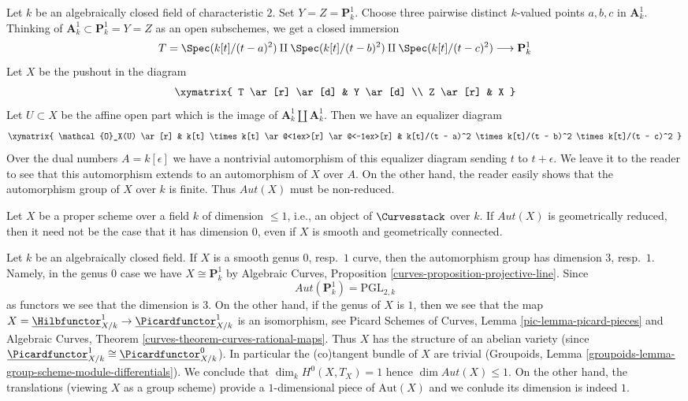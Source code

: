 \begin{example}
\label{example-non-reduced}
Let $k$ be an algebraically closed field of characteristic $2$.
Set $Y = Z = \mathbf{P}^1_k$. Choose three pairwise distinct $k$-valued points
$a, b, c$ in $\mathbf{A}^1_k$. Thinking of
$\mathbf{A}^1_k \subset \mathbf{P}^1_k = Y = Z$ as an open subschemes,
we get a closed immersion
$$
T =  \Spec(k[t]/(t - a)^2) \amalg \Spec(k[t]/(t - b)^2)
\amalg \Spec(k[t]/(t - c)^2)
\longrightarrow
\mathbf{P}^1_k
$$
Let $X$ be the pushout in the diagram
$$
\xymatrix{
T \ar[r] \ar[d] & Y \ar[d] \\
Z \ar[r] & X
}
$$
Let $U \subset X$ be the affine open part which is the image of
$\mathbf{A}^1_k \amalg \mathbf{A}^1_k$. Then we have an equalizer
diagram
$$
\xymatrix{
\mathcal{O}_X(U) \ar[r] &
k[t] \times k[t] \ar@<1ex>[r] \ar@<-1ex>[r] &
k[t]/(t - a)^2 \times k[t]/(t - b)^2 \times k[t]/(t - c)^2
}
$$
Over the dual numbers $A = k[\epsilon]$ we have a nontrivial automorphism
of this equalizer diagram sending $t$ to $t + \epsilon$. We leave it to the
reader to see that this automorphism extends to an automorphism of $X$
over $A$. On the other hand, the reader easily shows that the
automorphism group of $X$ over $k$ is finite.
Thus $\mathit{Aut}(X)$ must be non-reduced.
\end{example}

\noindent
Let $X$ be a proper scheme over a field $k$ of dimension $\leq 1$, i.e.,
an object of $\Curvesstack$ over $k$. If $\mathit{Aut}(X)$
is geometrically reduced, then it need not be the case that
it has dimension $0$, even if $X$ is smooth and geometrically connected.

\begin{example}
\label{example-pos-dim}
Let $k$ be an algebraically closed field. If $X$ is a smooth
genus $0$, resp.\ $1$ curve, then the automorphism group has
dimension $3$, resp.\ $1$. Namely, in the genus $0$ case we have
$X \cong \mathbf{P}^1_k$ by Algebraic Curves, Proposition
\ref{curves-proposition-projective-line}. Since
$$
\mathit{Aut}(\mathbf{P}^1_k) = \text{PGL}_{2, k}
$$
as functors we see that the dimension is $3$. On the other hand,
if the genus of $X$ is $1$, then we see that the map
$X = \underline{\Hilbfunctor}^1_{X/k} \to
\underline{\Picardfunctor}^1_{X/k}$ is an isomorphism, see
Picard Schemes of Curves, Lemma \ref{pic-lemma-picard-pieces}
and
Algebraic Curves, Theorem \ref{curves-theorem-curves-rational-maps}.
Thus $X$ has the structure of an abelian variety
(since $\underline{\Picardfunctor}^1_{X/k} \cong
\underline{\Picardfunctor}^0_{X/k}$).
In particular the (co)tangent bundle of $X$ are trivial
(Groupoids, Lemma \ref{groupoids-lemma-group-scheme-module-differentials}).
We conclude that $\dim_k H^0(X, T_X) = 1$ hence
$\dim \mathit{Aut}(X) \leq 1$. On the other hand, the translations
(viewing $X$ as a group scheme) provide a $1$-dimensional
piece of $\text{Aut}(X)$ and we conlude its dimension is indeed $1$.
\end{example}

